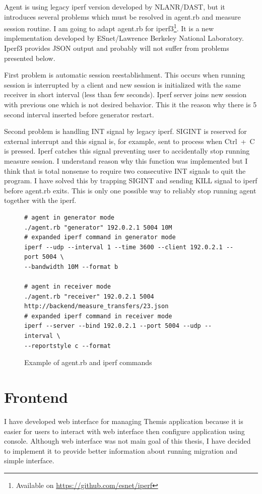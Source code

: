 Agent is using legacy iperf version developed by NLANR/DAST, but it introduces several problems which must be resolved in agent.rb and measure session routine. I am going to adapt agent.rb for iperf3\footnote{Available on \url{https://github.com/esnet/iperf}}. It is a new implementation developed by ESnet/Lawrence Berkeley National Laboratory. Iperf3 provides \Ac{JSON} output and probably will not suffer from problems presented below.

First problem is automatic session reestablishment. This occurs when running session is interrupted by a client and new session is initialized with the same receiver in short interval (less than few seconds). Iperf server joins new session with previous one which is not desired behavior. This it the reason why there is 5 second interval inserted before generator restart. 

Second problem is handling INT signal by legacy iperf. SIGINT is reserved for external interrupt and this signal is, for example, sent to process when \mbox{Ctrl + C} is pressed. Iperf catches this signal preventing user to accidentally stop running measure session. I understand reason why this function was implemented but I think that is total nonsense to require two consecutive INT signals to quit the program. I have solved this by trapping SIGINT and sending KILL signal to iperf before agent.rb exits. This is only one possible way to reliably stop running agent together with the iperf.

\begin{figure}[htb]
\caption{Example of agent.rb and iperf commands}
\label{code:fw}
\begin{verbatim}
# agent in generator mode
./agent.rb "generator" 192.0.2.1 5004 10M
# expanded iperf command in generator mode
iperf --udp --interval 1 --time 3600 --client 192.0.2.1 --port 5004 \
--bandwidth 10M --format b
	
# agent in receiver mode
./agent.rb "receiver" 192.0.2.1 5004 http://backend/measure_transfers/23.json
# expanded iperf command in receiver mode
iperf --server --bind 192.0.2.1 --port 5004 --udp --interval \
--reportstyle c --format
\end{verbatim}
\end{figure}



\section{Frontend}
I have developed web interface for managing Themis application because it is easier for users to interact with web interface then configure application using console. Although web interface was not main goal of this thesis, I have decided to implement it to provide better information about running migration and simple interface.

